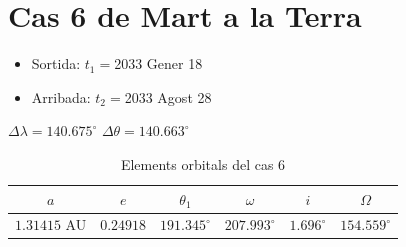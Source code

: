\section{Cas 6 de Mart a la Terra}
\begin{itemize}
	\item Sortida: $t_{1}=$2033 Gener 18
	\item Arribada: $t_{2}=$2033 Agost 28
\end{itemize}
$\Delta\lambda=140.675^{\circ}$
$\Delta\theta=140.663^{\circ}$
\begin{table}[h!]
	\centering
	\begin{tabular}{ |c|c|c|c|c|c|}
		\hline
		$a$ & $e$ & $\theta_{1}$ & $\omega$ & $i$ & $\Omega$ \\ \hline
		$1.31415$ AU  & $0.24918$ & $191.345^{\circ}$ & $207.993^{\circ}$ & $1.696^{\circ}$ & $154.559^{\circ}$ \\ \hline
	\end{tabular}
	\caption{Elements orbitals del cas 6}
\end{table}

